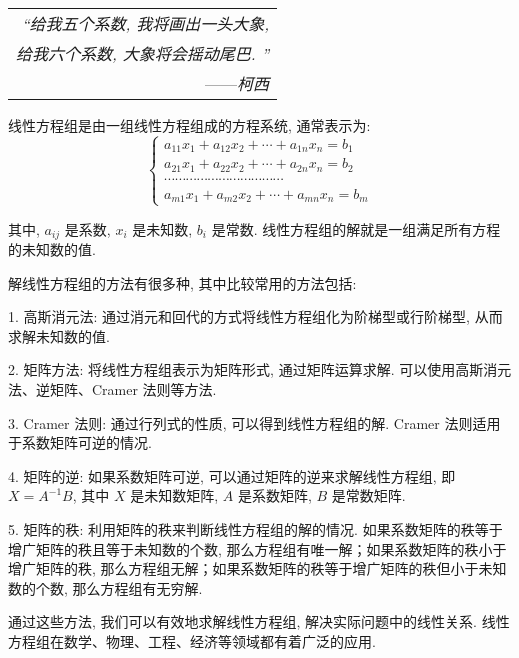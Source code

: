 \begin{flushright}
    \begin{tabular}{r||}
        \textit{“给我五个系数, 我将画出一头大象, }\\
        \textit{给我六个系数, 大象将会摇动尾巴. ”}\\
        ——\textit{柯西}
    \end{tabular}
\end{flushright}

线性方程组是由一组线性方程组成的方程系统, 通常表示为: 
$$\begin{cases}
    a_{11}x_1 + a_{12}x_2 + \cdots + a_{1n}x_n = b_1\\ 
    a_{21}x_1 + a_{22}x_2 + \cdots + a_{2n}x_n = b_2\\ 
    \cdots \cdots \cdots \cdots \cdots \cdots \cdots \cdots \cdots \cdots \cdots \\ 
    a_{m1}x_1 + a_{m2}x_2 + \cdots + a_{mn}x_n = b_m
\end{cases}$$

其中, $a_{ij}$ 是系数, $x_i$ 是未知数, $b_i$ 是常数. 线性方程组的解就是一组满足所有方程的未知数的值. 

解线性方程组的方法有很多种, 其中比较常用的方法包括: 

1. 高斯消元法: 通过消元和回代的方式将线性方程组化为阶梯型或行阶梯型, 从而求解未知数的值. 

2. 矩阵方法: 将线性方程组表示为矩阵形式, 通过矩阵运算求解. 可以使用高斯消元法、逆矩阵、Cramer 法则等方法. 

3. Cramer 法则: 通过行列式的性质, 可以得到线性方程组的解. Cramer 法则适用于系数矩阵可逆的情况. 

4. 矩阵的逆: 如果系数矩阵可逆, 可以通过矩阵的逆来求解线性方程组, 即 $X = A^{-1}B$, 其中 $X$ 是未知数矩阵, $A$ 是系数矩阵, $B$ 是常数矩阵. 

5. 矩阵的秩: 利用矩阵的秩来判断线性方程组的解的情况. 如果系数矩阵的秩等于增广矩阵的秩且等于未知数的个数, 那么方程组有唯一解；如果系数矩阵的秩小于增广矩阵的秩, 那么方程组无解；如果系数矩阵的秩等于增广矩阵的秩但小于未知数的个数, 那么方程组有无穷解. 

通过这些方法, 我们可以有效地求解线性方程组, 解决实际问题中的线性关系. 线性方程组在数学、物理、工程、经济等领域都有着广泛的应用. 
